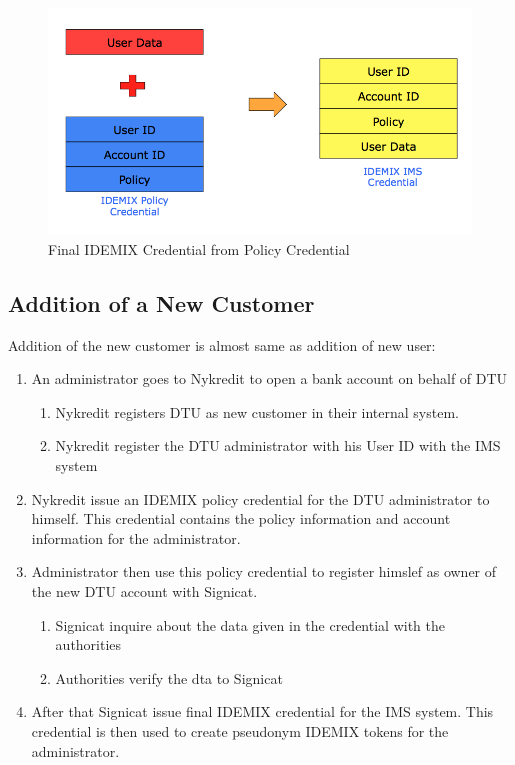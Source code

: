 \begin{figure}[h]
	\centering
	\includegraphics[width=\textwidth]{figures/Final}
	\caption{Final IDEMIX Credential from Policy Credential}
	\label{fig:Final}
\end{figure}
\FloatBarrier
\subsection{Addition of a New Customer}
Addition of the new customer is almost same as addition of new user:
\begin{enumerate}
	\item An administrator goes to Nykredit to open a bank account on behalf of DTU 
	\begin{enumerate}
		\item Nykredit registers DTU as new customer in their internal system.
		\item Nykredit register the DTU administrator with his User ID with the IMS system
	\end{enumerate}
	\item Nykredit issue an IDEMIX policy credential for the  DTU administrator to himself. This credential contains the policy information and account information for the administrator.
	\item Administrator then use this policy credential to register himslef as owner of the new DTU account with Signicat. 
	\begin{enumerate}
		\item Signicat inquire about the data given in the credential with the authorities
		\item Authorities verify the dta to Signicat
	\end{enumerate}
	\item After that Signicat issue final IDEMIX credential for the IMS system. This credential is then used to create pseudonym IDEMIX tokens for the administrator. 
\end{enumerate}
